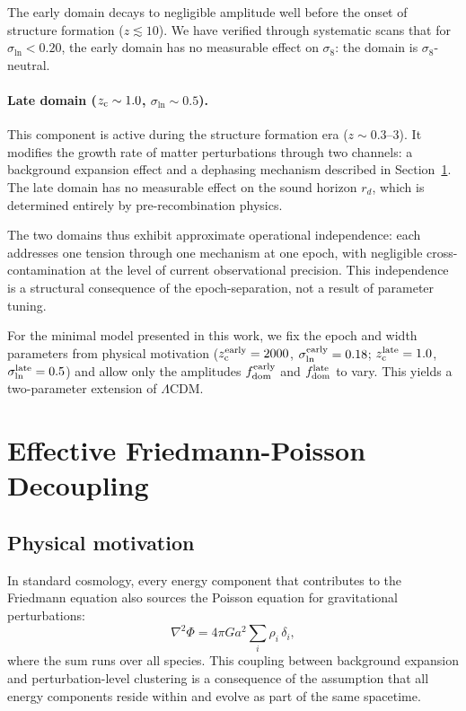 \documentclass[aps,prd,twocolumn,superscriptaddress,nofootinbib]{revtex4-2}
\newcommand{\fdom}{f_{\rm dom}}
\newcommand{\zc}{z_{\rm c}}
\newcommand{\sln}{\sigma_{\ln}}
\begin{document}
The early domain decays to negligible amplitude well before the onset 
of structure formation ($z \lesssim 10$). We have verified through 
systematic scans that for $\sln < 0.20$, the early domain has no 
measurable effect on $\sigma_8$: the domain is $\sigma_8$-neutral.

\paragraph{Late domain ($\zc \sim 1.0$, $\sln \sim 0.5$).}
This component is active during the structure formation era 
($z \sim 0.3$--$3$). It modifies the growth rate of matter 
perturbations through two channels: a background expansion effect 
and a dephasing mechanism described in Section~\ref{sec:decoupling}. 
The late domain has no measurable effect on the sound horizon $r_d$, 
which is determined entirely by pre-recombination physics.

The two domains thus exhibit approximate operational independence: 
each addresses one tension through one mechanism at one epoch, with 
negligible cross-contamination at the level of current observational 
precision. This independence is a structural consequence of the 
epoch-separation, not a result of parameter tuning.

For the minimal model presented in this work, we fix the epoch and
width parameters from physical motivation ($\zc^{\rm early} = 2000$,
$\sln^{\rm early} = 0.18$; $\zc^{\rm late} = 1.0$, $\sln^{\rm late}
= 0.5$) and allow only the amplitudes $\fdom^{\rm early}$ and
$\fdom^{\rm late}$ to vary. This yields a two-parameter extension
of $\Lambda$CDM.

\section{Effective Friedmann-Poisson Decoupling}
\label{sec:decoupling}

\subsection{Physical motivation}

In standard cosmology, every energy component that contributes to the 
Friedmann equation also sources the Poisson equation for gravitational 
perturbations:
\begin{equation}
\nabla^2\Phi = 4\pi G a^2 \sum_i \rho_i\,\delta_i,
\label{eq:poisson}
\end{equation}
where the sum runs over all species. This coupling between background 
expansion and perturbation-level clustering is a consequence of the 
assumption that all energy components reside within and evolve as part 
of the same spacetime.
\end{document}
